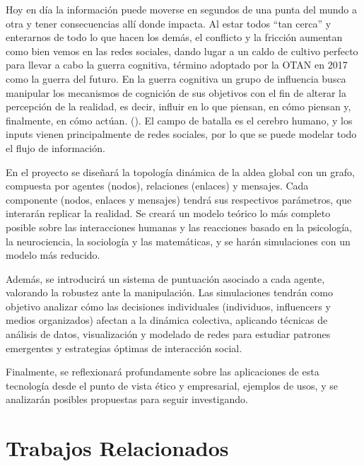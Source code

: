 \documentclass[12pt]{extarticle}
\numberwithin{equation}{section}
\begin{document}
Hoy en día la información puede moverse en segundos de una punta del mundo a otra y tener consecuencias allí donde impacta. Al estar todos ``tan cerca'' y enterarnos de todo lo que hacen los demás, el conflicto y la fricción aumentan como bien vemos en las redes sociales, dando lugar a un caldo de cultivo perfecto para llevar a cabo la guerra cognitiva, término adoptado por la OTAN en 2017 como la guerra del futuro. En la guerra cognitiva un grupo de influencia busca manipular los mecanismos de cognición de sus objetivos con el fin de alterar la percepción de la realidad, es decir, influir en lo que piensan, en cómo piensan y, finalmente, en cómo actúan. (\cite{GuerraCogniticaDirecto2025}).  El campo de batalla es el cerebro humano, y los inputs vienen principalmente de redes sociales, por lo que se puede modelar todo el flujo de información. \vspace{1em}

En el proyecto se diseñará la topología dinámica de la aldea global con un grafo, compuesta por agentes (nodos), relaciones (enlaces) y mensajes. Cada componente (nodos, enlaces y mensajes) tendrá sus respectivos parámetros, que interarán replicar la realidad. Se creará un modelo teórico lo más completo posible sobre las interacciones humanas y las reacciones basado en la psicología, la neurociencia, la sociología y las matemáticas, y se harán simulaciones con un modelo más reducido. \vspace{1em}

Además, se introducirá un sistema de puntuación asociado a cada agente, valorando la robustez ante la manipulación. Las simulaciones tendrán como objetivo analizar cómo las decisiones individuales (individuos, influencers y medios organizados) afectan a la dinámica colectiva, aplicando técnicas de análisis de datos, visualización y modelado de redes para estudiar patrones emergentes y estrategias óptimas de interacción social. \vspace{1em}

Finalmente, se reflexionará profundamente sobre las aplicaciones de esta tecnología desde el punto de vista ético y empresarial, ejemplos de usos, y se analizarán posibles propuestas para seguir investigando. 


\newpage

\section{Trabajos Relacionados}\label{sec:related} 
\end{document}
